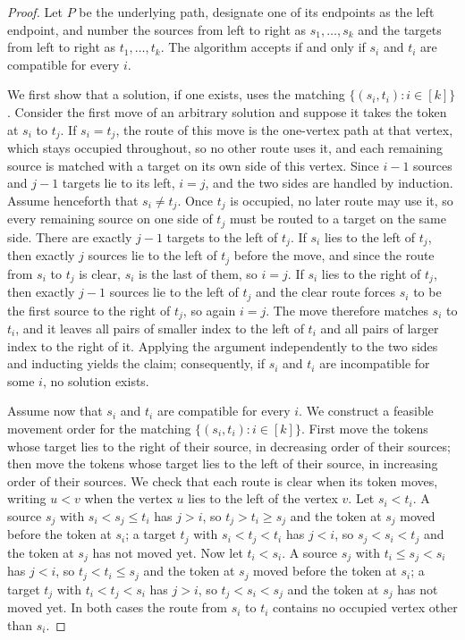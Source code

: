 \documentclass[a4paper,USenglish,thm-restate]{lipics-v2021}
\theoremstyle{problemstyle}
\begin{document}
\begin{proof}
Let $P$ be the underlying path, designate one of its endpoints as the left
endpoint, and number the sources from left to right as $s_1,\ldots,s_k$ and the
targets from left to right as $t_1,\ldots,t_k$. The algorithm accepts if and
only if $s_i$ and $t_i$ are compatible for every $i$.

We first show that a solution, if one exists, uses the matching
$\{(s_i,t_i):i\in[k]\}$. Consider the first move of an arbitrary
solution and suppose it takes the token at $s_i$ to $t_j$. If $s_i=t_j$,
the route of this move is the one-vertex path at that vertex, which stays
occupied throughout, so no other route uses it, and each remaining source is
matched with a target on its own side of this vertex. Since $i-1$ sources and $j-1$
targets lie to its left, $i=j$, and the two sides are handled by induction.
Assume henceforth that $s_i\ne t_j$. Once $t_j$ is
occupied, no later route may use it, so every remaining source on one side of
$t_j$ must be routed to a target on the same side. There are exactly $j-1$
targets to the left of $t_j$. If $s_i$ lies to the left of $t_j$, then exactly
$j$ sources lie to the left of $t_j$ before the move, and since the route from
$s_i$ to $t_j$ is clear, $s_i$ is the last of them, so $i=j$. If $s_i$ lies to
the right of $t_j$, then exactly $j-1$ sources lie to the left of $t_j$ and the
clear route forces $s_i$ to be the first source to the right of $t_j$, so again
$i=j$. The move therefore matches $s_i$ to $t_i$, and it leaves all pairs of
smaller index to the left of $t_i$ and all pairs of larger index
to the right of it. Applying the argument independently to the two
sides and inducting yields the claim; consequently, if $s_i$ and $t_i$ are
incompatible for some $i$, no solution exists.

Assume now that $s_i$ and $t_i$ are compatible for every $i$. We construct a
feasible movement order for the matching $\{(s_i,t_i):i\in[k]\}$. First move
the tokens whose target lies to the right of their source, in decreasing
order of their sources; then move the tokens whose target lies to the left of
their source, in increasing order of their sources. We check that each route
is clear when its token moves, writing $u<v$ when the vertex $u$ lies to the
left of the vertex $v$. Let $s_i<t_i$. A source $s_j$ with
$s_i<s_j\le t_i$ has $j>i$, so $t_j>t_i\ge s_j$ and the token at $s_j$ moved
before the token at $s_i$; a target $t_j$ with $s_i<t_j<t_i$ has $j<i$, so
$s_j<s_i<t_j$ and the token at $s_j$ has not moved yet. Now let $t_i<s_i$. A
source $s_j$ with $t_i\le s_j<s_i$ has $j<i$, so $t_j<t_i\le s_j$ and the token at
$s_j$ moved before the token at $s_i$; a target $t_j$ with $t_i<t_j<s_i$ has
$j>i$, so $t_j<s_i<s_j$ and the token at $s_j$ has not moved yet. In both
cases the route from $s_i$ to $t_i$ contains no occupied vertex other than
$s_i$.


\end{proof}
\end{document}

